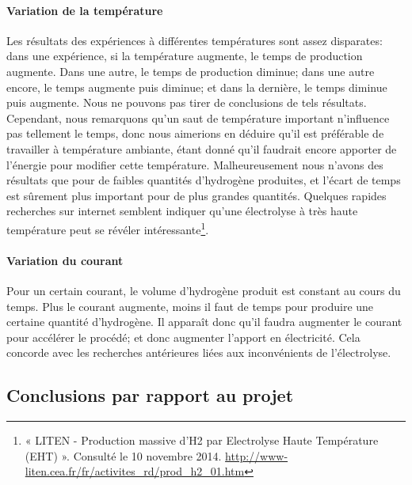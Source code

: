 \paragraph{Variation de la température} Les résultats des expériences à différentes températures sont assez disparates:
dans une expérience, si la température augmente, le temps de production augmente. Dans une autre, le temps de production
diminue; dans une autre encore, le temps augmente puis diminue; et dans la dernière, le temps diminue puis augmente.
Nous ne pouvons pas tirer de conclusions de tels résultats. Cependant, nous remarquons qu'un saut de température important
n'influence pas tellement le temps, donc nous aimerions en déduire qu'il est préférable de travailler à température
ambiante, étant donné qu'il faudrait encore apporter de l'énergie pour modifier cette température. Malheureusement 
nous n'avons des résultats que pour de faibles quantités d'hydrogène produites, et l'écart de temps est sûrement plus 
important pour de plus grandes quantités. Quelques rapides recherches sur internet semblent indiquer qu'une électrolyse
à très haute température peut se révéler intéressante\footnote{« LITEN - Production massive d’H2 par Electrolyse 
Haute Température (EHT) ». Consulté le 10 novembre 2014. \url{http://www-liten.cea.fr/fr/activites_rd/prod_h2_01.htm}}.

\paragraph{Variation du courant} Pour un certain courant, le volume d'hydrogène produit est constant au cours du temps.
Plus le courant augmente, moins il faut de temps pour produire une certaine quantité d'hydrogène. Il apparaît donc 
qu'il faudra augmenter le courant pour accélérer le procédé; et donc augmenter l'apport en électricité. Cela concorde 
avec les recherches antérieures liées aux inconvénients de l'électrolyse.

\subsection{Conclusions par rapport au projet}

